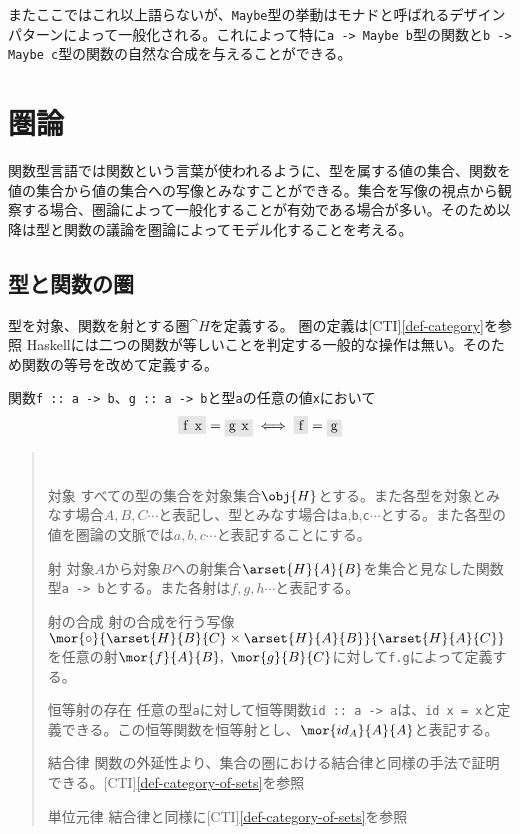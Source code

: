 \documentclass[uplatex,dvipdfmx]{jsarticle}
\newcommand{\pr}[1]{\colorbox[rgb]{0.9,0.9,0.9}{\lstinline{#1}}}
\newcommand{\functype}[2]{\pr{#1 -> #2}}
\newcommand{\refcti}[1]{[CTI]\ref{#1}}
\newcommand{\fpmor}[3]{\pr{#1 :: #2 -> #3}}
\begin{document}
  またここではこれ以上語らないが、\pr{Maybe}型の挙動はモナドと呼ばれるデザインパターンによって一般化される。これによって特に\pr{a -> Maybe b}型の関数と\pr{b -> Maybe c}型の関数の自然な合成を与えることができる。
  \section{圏論}
  関数型言語では関数という言葉が使われるように、型を属する値の集合、関数を値の集合から値の集合への写像とみなすことができる。集合を写像の視点から観察する場合、圏論によって一般化することが有効である場合が多い。そのため以降は型と関数の議論を圏論によってモデル化することを考える。
  \subsection{型と関数の圏}
  型を対象、関数を射とする圏$\cat{H}$を定義する。
  圏の定義は\refcti{def-category}を参照
  Haskellには二つの関数が等しいことを判定する一般的な操作は無い。そのため関数の等号を改めて定義する。
  \begin{define}[関数の外延性]\label{def-function-extensionality}
    関数\fpmor{f}{a}{b}、\fpmor{g}{a}{b}と型\pr{a}の任意の値\pr{x}において\[\pr{f x}=\pr{g x} \iff \pr{f} = \pr{g}\]
  \end{define}
  \begin{define}[型と関数の圏]\label{def-hask-category}
		\begin{quote}~
			\begin{mydescription}
        \item[対象] すべての型の集合を対象集合$\obj{H}$とする。また各型を対象とみなす場合$A,B,C\cdots$と表記し、型とみなす場合は\pr{a},\pr{b},\pr{c}$\cdots$とする。また各型の値を圏論の文脈では$a,b,c\cdots$と表記することにする。
        \item[射] 対象$A$から対象$B$への射集合$\arset{H}{A}{B}$を集合と見なした関数型\functype{a}{b}とする。また各射は$f,g,h\cdots$と表記する。
        \item[射の合成] 射の合成を行う写像$\mor{\circ}{\arset{H}{B}{C}\times\arset{H}{A}{B}}{\arset{H}{A}{C}}$を任意の射$\mor{f}{A}{B},\ \mor{g}{B}{C}$に対して\pr{f.g}によって定義する。
        \item[恒等射の存在] 任意の型\pr{a}に対して恒等関数\fpmor{id}{a}{a}は、\pr{id x = x}と定義できる。この恒等関数を恒等射とし、$\mor{id_A}{A}{A}$と表記する。
        \item[結合律] 関数の外延性より、集合の圏における結合律と同様の手法で証明できる。\refcti{def-category-of-sets}を参照
        \item[単位元律]結合律と同様に\refcti{def-category-of-sets}を参照
		  \end{mydescription}
		\end{quote}
	\end{define}
\end{document}
